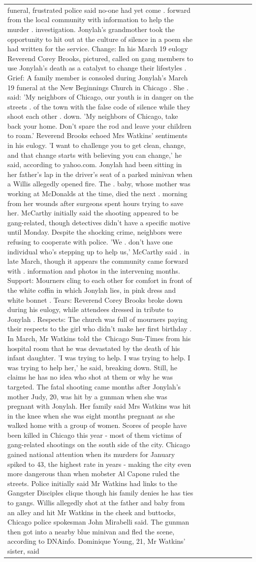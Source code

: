 \begin{table}[H]
\begin{tabular}{lllrlllll}
funeral, frustrated police said no-one had yet come . forward from the local community with information to help the murder . investigation. Jonylah's grandmother took the opportunity to hit out at the culture of silence in a poem she had written for the service. Change: In his March 19 eulogy Reverend Corey Brooks, pictured, called on gang members to use Jonylah's death as a catalyst to change their lifestyles . Grief: A family member is consoled during Jonylah's March 19 funeral at the New Beginnings Church in Chicago . She . said: 'My neighbors of Chicago, our youth is in danger on the streets . of the town with the false code of silence while they shoot each other . down. 'My neighbors of Chicago, take back your home. Don't spare the rod and leave your children to roam.' Reverend Brooks echoed Mrs Watkins' sentiments in his eulogy. 'I want to challenge you to get clean, change, and that change starts with believing you can change,' he said, according to yahoo.com. Jonylah had been sitting in her father's lap in the driver's seat of a parked minivan when a Willis allegedly opened fire. The . baby, whose mother was working at McDonalds at the time, died the next . morning from her wounds after surgeons spent hours trying to save her. McCarthy initially said the shooting appeared to be gang-related, though detectives didn't have a specific motive until Monday. Despite the shocking crime, neighbors were refusing to cooperate with police. 'We . don't have one individual who's stepping up to help us,' McCarthy said . in late March, though it appears the community came forward with . information and photos in the intervening months. Support: Mourners cling to each other for comfort in front of the white coffin in which Jonylah lies, in pink dress and white bonnet . Tears: Reverend Corey Brooks broke down during his eulogy, while attendees dressed in tribute to Jonylah . Respects: The church was full of mourners paying their respects to the girl who didn't make her first birthday . In March, Mr Watkins told the Chicago Sun-Times from his hospital room that he was devastated by the death of his infant daughter. 'I was trying to help. I was trying to help. I was trying to help her,' he said, breaking down. Still, he claims he has no idea who shot at them or why he was targeted. The fatal shooting came months after Jonylah's mother Judy, 20, was hit by a gunman when she was pregnant with Jonylah. Her family said Mrs Watkins was hit in the knee when she was eight months pregnant as she walked home with a group of women. Scores of people have been killed in Chicago this year - most of them victims of gang-related shootings on the south side of the city. Chicago gained national attention when its murders for January spiked to 43, the highest rate in years - making the city even more dangerous than when mobster Al Capone ruled the streets. Police initially said Mr Watkins had links to the Gangster Disciples clique though his family denies he has ties to gangs. Willis allegedly shot at the father and baby from an alley and hit Mr Watkins in the cheek and buttocks, Chicago police spokesman John Mirabelli said. The gunman then got into a nearby blue minivan and fled the scene, according to DNAinfo. Dominique Young, 21, Mr Watkins' sister, said 
\end{tabular}
\end{table}
